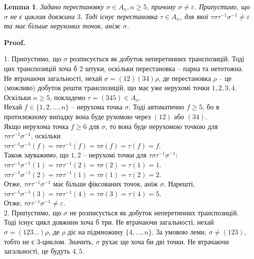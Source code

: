 \documentclass[a4paper, 10pt]{article}
\makeatletter
\theoremstyle{theoremdd}
\theoremstyle{theoremdd}
\theoremstyle{theoremdd}
\theoremstyle{theoremdd}
\theoremstyle{theoremdd}
\theoremstyle{theoremdd}
\theoremstyle{theoremdd}
\theoremstyle{theoremdd}
\theoremstyle{theoremdd}
\theoremstyle{theoremdd}
\theoremstyle{theoremdd}
\theoremstyle{theoremdd}
\theoremstyle{theoremdd}
\newtheorem{lemma}[theorem]{Lemma}
\theoremstyle{theoremdd}
\theoremstyle{theoremdd}
\renewenvironment{proof}[1][Proof.\\]{\par
\pushQED{\hfill \qed}%
\normalfont \topsep6\p@\@plus6\p@\relax
\trivlist
\item\relax
{\bfseries
#1\@addpunct{.}}\hspace\labelsep\ignorespaces
}{%
\popQED\endtrivlist\@endpefalse
}
\makeatother
\begin{document}
\begin{lemma}
Задано перестановку $\sigma \in A_n, n \geq 5$, причому $\sigma \neq \varepsilon$. Припустимо, що $\sigma$ не є циклом довжини $3$. Тоді існує перестановка $\tau \in A_n$, для якої $\tau \sigma \tau^{-1} \sigma^{-1} \neq \varepsilon$ та має більше нерухомих точок, аніж $\sigma$.
\end{lemma}

\begin{proof}
1. Припустимо, що $\sigma$ розписується як добуток неперетинних транспозицій. Тоді цих транспозицій хоча б $2$ штуки, оскільки перестановка -- парна та нетотожна. Не втрачаючи загальності, нехай $\sigma = (12)(34) \rho$, де перестановка $\rho$ -- це (можливо) добуток решти транспозицій, що має уже нерухомі точки $1,2,3,4$. Оскільки $n \geq 5$, покладемо $\tau = (345) \in A_n$.\\
Нехай $f \in \{1,2,\dots,n\}$ -- нерухома точка $\sigma$. Тоді автоматично $f \geq 5$, бо в протилежному випадку вона буде рухомою через $(12)$ або $(34)$.\\
Якщо нерухома точка $f \geq 6$ для $\sigma$, то вона буде нерухомою точкою для \\ $\tau \sigma \tau^{-1} \sigma^{-1}$, оскільки\\
$\tau \sigma \tau^{-1} \sigma^{-1} (f) = \tau \sigma \tau^{-1} (f) = \tau \sigma (f) = \tau (f) = f$.\\
Також зауважимо, що $1,2$ -- нерухомі точки для $\tau \sigma \tau^{-1} \sigma^{-1}$:\\
$\tau \sigma \tau^{-1} \sigma^{-1} (1) = \tau \sigma \tau^{-1}(2) = \tau \sigma(2) = \tau(1) = 1$.\\
$\tau \sigma \tau^{-1} \sigma^{-1} (2) = \tau \sigma \tau^{-1}(1) = \tau \sigma (1) = \tau (2) = 2$.\\
Отже, $\tau \sigma \tau^{-1} \sigma^{-1}$ має більше фіксованих точок, аніж $\sigma$. Нарешті,\\
$\tau \sigma \tau^{-1} \sigma^{-1} (3) = \tau \sigma \tau^{-1} (4) = \tau \sigma(3) = \tau(4) = 5$.\\
Отже, $\tau \sigma \tau^{-1} \sigma^{-1} \neq \varepsilon$.
\bigskip \\
2. Припустимо, що $\sigma$ не розписується як добуток неперетинних транспозицій. Тоді існує цикл довжини хоча б три. Не втрачаючи загальності, нехай $\sigma = (123 \dots) \rho$, де $\rho$ діє на підмножину $\{4,\dots,n\}$. За умовою леми, $\sigma \neq (123)$, тобто не є 3-циклом. Значить, $\sigma$ рухає ще хоча би дві точки. Не втрачаючи загальності, це будуть $4,5$.\\

\end{proof}
\end{document}

